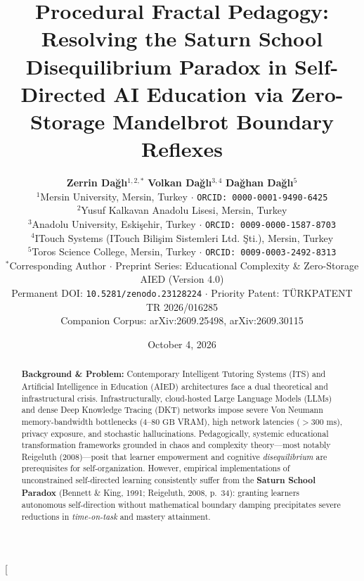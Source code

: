 \documentclass[10pt,twocolumn,a4paper]{article}
\title{\textbf{Procedural Fractal Pedagogy: Resolving the Saturn School Disequilibrium Paradox in Self-Directed AI Education via Zero-Storage Mandelbrot Boundary Reflexes}}
\author{
    \textbf{Zerrin Da\u{g}l\i}$^{1,2,*}$ \quad \textbf{Volkan Da\u{g}l\i}$^{3,4}$ \quad \textbf{Da\u{g}han Da\u{g}l\i}$^{5}$ \\[6pt]
    \small $^{1}$Mersin University, Mersin, Turkey $\cdot$ \texttt{ORCID: 0000-0001-9490-6425} \\
    \small $^{2}$Yusuf Kalkavan Anadolu Lisesi, Mersin, Turkey \\
    \small $^{3}$Anadolu University, Eski\c{s}ehir, Turkey $\cdot$ \texttt{ORCID: 0009-0000-1587-8703} \\
    \small $^{4}$ITouch Systems (ITouch Bili\c{s}im Sistemleri Ltd. \c{S}ti.), Mersin, Turkey \\
    \small $^{5}$Toros Science College, Mersin, Turkey $\cdot$ \texttt{ORCID: 0009-0003-2492-8313} \\[4pt]
    \small $^{*}$Corresponding Author $\cdot$ Preprint Series: Educational Complexity \& Zero-Storage AIED (Version 4.0) \\
    \small Permanent DOI: \texttt{10.5281/zenodo.23128224} $\cdot$ Priority Patent: T\"URKPATENT TR 2026/016285 \\
    \small Companion Corpus: arXiv:2609.25498, arXiv:2609.30115
}
\date{October 4, 2026}
\begin{document}
\twocolumn[
  \begin{@twocolumnfalse}
    \maketitle
    \begin{abstract}
      \noindent \textbf{Background \& Problem:} Contemporary Intelligent Tutoring Systems (ITS) and Artificial Intelligence in Education (AIED) architectures face a dual theoretical and infrastructural crisis. Infrastructurally, cloud-hosted Large Language Models (LLMs) and dense Deep Knowledge Tracing (DKT) networks impose severe Von Neumann memory-bandwidth bottlenecks ($4\text{--}80\text{ GB}$ VRAM), high network latencies ($>300\text{ ms}$), privacy exposure, and stochastic hallucinations. Pedagogically, systemic educational transformation frameworks grounded in chaos and complexity theory---most notably Reigeluth (2008)---posit that learner empowerment and cognitive \textit{disequilibrium} are prerequisites for self-organization. However, empirical implementations of unconstrained self-directed learning consistently suffer from the \textbf{Saturn School Paradox} (Bennett \& King, 1991; Reigeluth, 2008, p.~34): granting learners autonomous self-direction without mathematical boundary damping precipitates severe reductions in \textit{time-on-task} and mastery attainment. \par\vspace{4pt}

\end{abstract}
\end{@twocolumnfalse}
\end{document}
